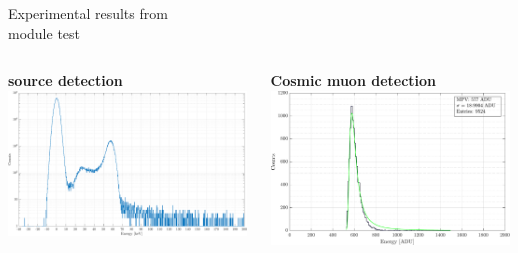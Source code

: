 \documentclass[aspectratio=169,xcolor=dvipsnames]{beamer}
\begin{document}
\begin{frame}{\vspace{-0.3cm}Experimental results from\\ \vskip-0.15cm module test}
\begin{columns}
            \fontsize{7pt}{1}\selectfont
            \centering
            \textbf{ source detection} \\
            \vspace{0.1cm}
            \includegraphics[width=0.99\textwidth]{images/muon_detection/ch4_americio_log.pdf}
            
            \vskip0.15cm
            \textbf{Cosmic muon detection} \\
            \vspace{0.1cm}
            \includegraphics[width=0.99\textwidth]{images/muon_detection/incoming_energy_thr130_ZS_landau.pdf}
    \end{columns}
\end{frame}
\end{document}
